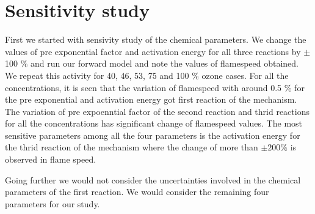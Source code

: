 \section{Sensitivity study}

 First we started with sensivity study of the chemical parameters. We
 change the values of pre exponential factor and activation energy for
 all three reactions by $\pm$ 100 $\% $ and run our forward model and
 note the values of flamespeed obtained. We repeat this activity for
 40, 46, 53, 75 and 100 $\%$ ozone cases. For all the concentrations,
 it is seen that the variation of flamespeed with around 0.5 $\%$ for
 the pre exponential and activation energy got first reaction of the
 mechanism. The variation of pre expoenntial factor of the second
 reaction and thrid reactions for all the concentrations has
 significant change of flamespeed values. The most sensitive
 parameters among all the four parameters is the activation energy for
 the thrid reaction of the mechanism where the change of more than
 $\pm 200\%$ is observed in flame speed.


 Going further we would not consider the uncertainties involved in the
 chemical parameters of the first reaction. We would consider the
 remaining four parameters for our study.
